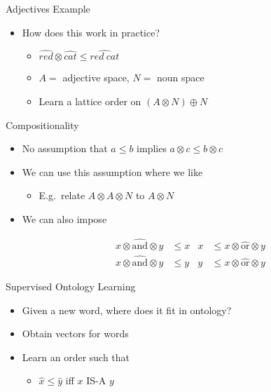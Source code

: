 \documentclass{beamer}
\newlength{\wideitemsep}
\let\olditem\item
\renewcommand{\item}{\setlength{\itemsep}{\wideitemsep}\olditem}
\newcommand{\context}[1]{\ensuremath{\widehat{\mathit{#1}}}}
\begin{document}
\begin{frame}{Adjectives Example}
\begin{itemize}
\item How does this work in practice?
\begin{itemize}
\item $\context{red}\otimes\context{cat}\le \context{red\ cat}$
\item $A =$ adjective space, $N =$ noun space
\item Learn a lattice order on $(A\otimes N)\oplus N$
\end{itemize}
\end{itemize}
\end{frame}

\begin{frame}{Compositionality}
\begin{itemize}
\item No assumption that $a \le b$ implies $a\otimes c \le b \otimes c$
\item We can use this assumption where we like
\begin{itemize}
\item E.g.~relate $A\otimes A\otimes N$ to $A\otimes N$
\end{itemize}
\item We can also impose

\begin{align*}
x \otimes \widehat{\mathrm{and}} \otimes y &\le x & x &\le x \otimes \widehat{\mathrm{or}} \otimes y\\
x \otimes \widehat{\mathrm{and}} \otimes y &\le y & y &\le x \otimes \widehat{\mathrm{or}} \otimes y
\end{align*}

\end{itemize}
\end{frame}

\begin{frame}{Supervised Ontology Learning}
\begin{itemize}
\item Given a new word, where does it fit in ontology?
\item Obtain vectors for words
\item Learn an order such that
\begin{itemize}
\item $\context{x} \le \context{y}$ iff $x$ IS-A $y$
\end{itemize}
\end{itemize}
\end{frame}
\end{document}
